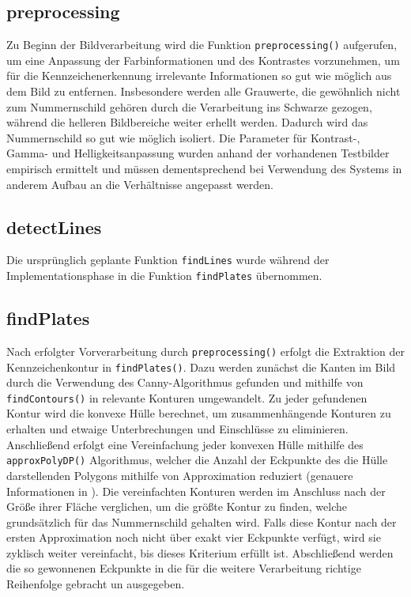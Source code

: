 \documentclass{../Vorlage/sebDenCls}
\begin{document}
\subsection{preprocessing}
\label{prepro}
Zu Beginn der Bildverarbeitung wird die Funktion \texttt{preprocessing()} aufgerufen, um eine Anpassung der Farbinformationen und des Kontrastes vorzunehmen, um für die Kennzeichenerkennung irrelevante Informationen so gut wie möglich aus dem Bild zu entfernen.
Insbesondere werden alle Grauwerte, die gewöhnlich nicht zum Nummernschild gehören durch die Verarbeitung ins Schwarze gezogen, während die helleren Bildbereiche weiter erhellt werden. Dadurch wird das Nummernschild so gut wie möglich isoliert. Die Parameter für Kontrast-, Gamma-  und Helligkeitsanpassung wurden anhand der vorhandenen Testbilder empirisch ermittelt und müssen dementsprechend bei Verwendung des Systems in anderem Aufbau an die Verhältnisse angepasst werden.\\




\subsection{detectLines}
Die ursprünglich geplante Funktion \texttt{findLines} wurde während der Implementationsphase in die Funktion \texttt{findPlates} übernommen. 

\subsection{findPlates}
\label{findpl}

Nach erfolgter Vorverarbeitung durch \texttt{preprocessing()} erfolgt die Extraktion der Kennzeichenkontur in \texttt{findPlates()}. Dazu werden zunächst die Kanten im Bild durch die Verwendung des Canny-Algorithmus gefunden und mithilfe von \texttt{findContours()} in relevante Konturen umgewandelt. Zu jeder gefundenen Kontur wird die konvexe Hülle berechnet, um zusammenhängende Konturen zu erhalten und etwaige Unterbrechungen und Einschlüsse zu eliminieren. Anschließend erfolgt eine Vereinfachung jeder konvexen Hülle mithilfe des \texttt{approxPolyDP()} Algorithmus, welcher die Anzahl der Eckpunkte des die Hülle darstellenden Polygons mithilfe von Approximation reduziert (genauere Informationen in \cite{opCV14}). Die vereinfachten Konturen werden im Anschluss nach der Größe ihrer Fläche verglichen, um die größte Kontur zu finden, welche grundsätzlich für das Nummernschild gehalten wird. Falls diese Kontur nach der ersten Approximation noch nicht über exakt vier Eckpunkte verfügt, wird sie zyklisch weiter vereinfacht, bis dieses Kriterium erfüllt ist. Abschließend werden die so gewonnenen Eckpunkte in die für die weitere Verarbeitung richtige Reihenfolge gebracht un ausgegeben.
\end{document}
